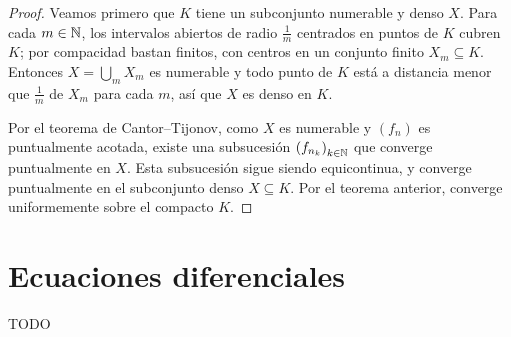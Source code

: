 \begin{proof}
  Veamos primero que \(K\) tiene un subconjunto numerable y denso \(X\). Para cada \(m \in \mathbb{N}\), los intervalos abiertos de radio \(\frac{1}{m}\) centrados en puntos de \(K\) cubren \(K\); por compacidad bastan finitos, con centros en un conjunto finito \(X_m \subseteq K\). Entonces \(X = \bigcup_m X_m\) es numerable y todo punto de \(K\) está a distancia menor que \(\frac{1}{m}\) de \(X_m\) para cada \(m\), así que \(X\) es denso en \(K\).

  Por el teorema de Cantor--Tijonov, como \(X\) es numerable y \({(f_n)}\) es puntualmente acotada, existe una subsucesión \({(f_{n_k})}_{k \in \mathbb{N}}\) que converge puntualmente en \(X\). Esta subsucesión sigue siendo equicontinua, y converge puntualmente en el subconjunto denso \(X \subseteq K\). Por el teorema anterior, converge uniformemente sobre el compacto \(K\).
\end{proof}

\section{Ecuaciones diferenciales}

TODO
